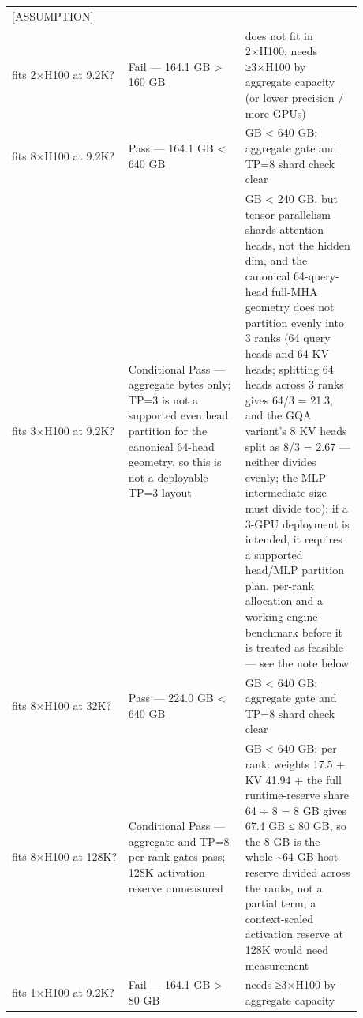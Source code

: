 \begin{longtable}[]{@{}
  >{\raggedright\arraybackslash}p{0.2927\linewidth}
  >{\raggedright\arraybackslash}p{0.2927\linewidth}
  >{\raggedright\arraybackslash}p{0.2927\linewidth}@{}}
{scenario{]}}\hspace{0pt}\mbox{{[}ASSUMPTION{]}} \\
fits 2×H100 at 9.2K? & Fail --- 164.1 GB \textgreater{} 160 GB & does
not fit in 2×H100; needs ≥3×H100 by aggregate capacity (or lower
precision / more GPUs) \\
fits 8×H100 at 9.2K? & Pass --- 164.1 GB \textless{} 640 GB & 164.1 GB
\textless{} 640 GB; aggregate gate and TP=8 shard check clear \\
fits 3×H100 at 9.2K? & Conditional Pass --- aggregate bytes only; TP=3
is not a supported even head partition for the canonical 64-head
geometry, so this is not a deployable TP=3 layout & 164.1 GB \textless{}
240 GB, but tensor parallelism shards attention heads, not the hidden
dim, and the canonical 64-query-head full-MHA geometry does not
partition evenly into 3 ranks (64 query heads and 64 KV heads; splitting
64 heads across 3 ranks gives 64/3 = 21.3, and the GQA variant's 8 KV
heads split as 8/3 = 2.67 --- neither divides evenly; the MLP
intermediate size must divide too); if a 3-GPU deployment is intended,
it requires a supported head/MLP partition plan, per-rank allocation and
a working engine benchmark before it is treated as feasible --- see the
note below \\
fits 8×H100 at 32K? & Pass --- 224.0 GB \textless{} 640 GB & 224.0 GB
\textless{} 640 GB; aggregate gate and TP=8 shard check clear \\
fits 8×H100 at 128K? & Conditional Pass --- aggregate and TP=8 per-rank
gates pass; 128K activation reserve unmeasured & 475.5 GB \textless{}
640 GB; per rank: weights 17.5 + KV 41.94 + the full runtime-reserve
share 64 ÷ 8 = 8 GB gives 67.4 GB ≤ 80 GB, so the 8 GB is the whole
\textasciitilde64 GB host reserve divided across the ranks, not a
partial term; a context-scaled activation reserve at 128K would need
measurement \\
fits 1×H100 at 9.2K? & Fail --- 164.1 GB \textgreater{} 80 GB & needs
≥3×H100 by aggregate capacity \\
\end{longtable}

